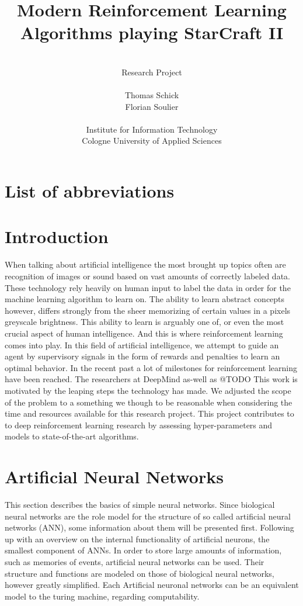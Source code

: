 \documentclass[12pt,a4paper]{article}
\author{\\Research Project\\ \\Thomas Schick\\Florian Soulier\\ \\ Institute for Information Technology\\
Cologne University of Applied Sciences}
\title{Modern Reinforcement Learning Algorithms playing StarCraft II}
\begin{document}
\noindent

\newpage
\tableofcontents{}
\newpage
\section*{List of abbreviations}

\newpage
{}
\section{Introduction} 
When talking about artificial intelligence the most brought up topics often are recognition of images or sound based on vast amounts of correctly labeled data.
These technology rely heavily on human input to label the data in order for the machine learning algorithm to learn on.
The ability to learn abstract concepts however, differs strongly from the sheer memorizing of certain values in a pixels greyscale brightness.
This ability to learn is arguably one of, or even the most crucial aspect of human intelligence. And this is where reinforcement learning comes into play.
In this field of artificial intelligence, we attempt to guide an agent by supervisory signals in the form of rewards and penalties to learn an optimal behavior.
In the recent past a lot of milestones for reinforcement learning have been reached. The researchers at DeepMind as-well as @TODO
This work is motivated by the leaping steps the technology has made.
We adjusted the scope of the problem to a something we though to be reasonable when considering the time and resources available for this research project. 
This project contributes to to deep reinforcement learning research by assessing hyper-parameters and models to state-of-the-art algorithms.
\section{Artificial Neural Networks}
This section describes the basics of simple neural networks. Since biological neural networks are the role model for the structure of so called artificial neural networks (ANN), some information about them will be presented first.
Following up with an overview on the internal functionality of artificial neurons, the smallest component of ANNs.
In order to store large amounts of information, such as memories of events, artificial neural networks can be used. Their structure and functions are modeled on those of biological neural networks, however greatly simplified.
Each 
Artificial neuronal networks can be an equivalent model to the turing machine, regarding computability.
\end{document}
